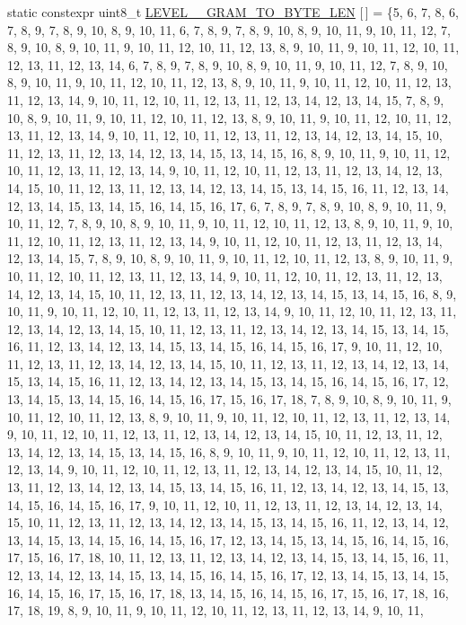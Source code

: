 \begin{DoxyCompactItemize}
static constexpr uint8\+\_\+t \hyperlink{classuva_1_1smt_1_1bpbd_1_1server_1_1lm_1_1m__grams_1_1m__gram__id_1_1_byte___m___gram___id_a9f88e7c86bd5e93cb7d5ebbf2cf680c7}{L\+E\+V\+E\+L\+\_\+\_\+\+G\+R\+A\+M\+\_\+\+T\+O\+\_\+\+B\+Y\+T\+E\+\_\+\+L\+E\+N} \mbox{[}$\,$\mbox{]} = \{5, 6, 7, 8, 6, 7, 8, 9, 7, 8, 9, 10, 8, 9, 10, 11, 6, 7, 8, 9, 7, 8, 9, 10, 8, 9, 10, 11, 9, 10, 11, 12, 7, 8, 9, 10, 8, 9, 10, 11, 9, 10, 11, 12, 10, 11, 12, 13, 8, 9, 10, 11, 9, 10, 11, 12, 10, 11, 12, 13, 11, 12, 13, 14, 6, 7, 8, 9, 7, 8, 9, 10, 8, 9, 10, 11, 9, 10, 11, 12, 7, 8, 9, 10, 8, 9, 10, 11, 9, 10, 11, 12, 10, 11, 12, 13, 8, 9, 10, 11, 9, 10, 11, 12, 10, 11, 12, 13, 11, 12, 13, 14, 9, 10, 11, 12, 10, 11, 12, 13, 11, 12, 13, 14, 12, 13, 14, 15, 7, 8, 9, 10, 8, 9, 10, 11, 9, 10, 11, 12, 10, 11, 12, 13, 8, 9, 10, 11, 9, 10, 11, 12, 10, 11, 12, 13, 11, 12, 13, 14, 9, 10, 11, 12, 10, 11, 12, 13, 11, 12, 13, 14, 12, 13, 14, 15, 10, 11, 12, 13, 11, 12, 13, 14, 12, 13, 14, 15, 13, 14, 15, 16, 8, 9, 10, 11, 9, 10, 11, 12, 10, 11, 12, 13, 11, 12, 13, 14, 9, 10, 11, 12, 10, 11, 12, 13, 11, 12, 13, 14, 12, 13, 14, 15, 10, 11, 12, 13, 11, 12, 13, 14, 12, 13, 14, 15, 13, 14, 15, 16, 11, 12, 13, 14, 12, 13, 14, 15, 13, 14, 15, 16, 14, 15, 16, 17, 6, 7, 8, 9, 7, 8, 9, 10, 8, 9, 10, 11, 9, 10, 11, 12, 7, 8, 9, 10, 8, 9, 10, 11, 9, 10, 11, 12, 10, 11, 12, 13, 8, 9, 10, 11, 9, 10, 11, 12, 10, 11, 12, 13, 11, 12, 13, 14, 9, 10, 11, 12, 10, 11, 12, 13, 11, 12, 13, 14, 12, 13, 14, 15, 7, 8, 9, 10, 8, 9, 10, 11, 9, 10, 11, 12, 10, 11, 12, 13, 8, 9, 10, 11, 9, 10, 11, 12, 10, 11, 12, 13, 11, 12, 13, 14, 9, 10, 11, 12, 10, 11, 12, 13, 11, 12, 13, 14, 12, 13, 14, 15, 10, 11, 12, 13, 11, 12, 13, 14, 12, 13, 14, 15, 13, 14, 15, 16, 8, 9, 10, 11, 9, 10, 11, 12, 10, 11, 12, 13, 11, 12, 13, 14, 9, 10, 11, 12, 10, 11, 12, 13, 11, 12, 13, 14, 12, 13, 14, 15, 10, 11, 12, 13, 11, 12, 13, 14, 12, 13, 14, 15, 13, 14, 15, 16, 11, 12, 13, 14, 12, 13, 14, 15, 13, 14, 15, 16, 14, 15, 16, 17, 9, 10, 11, 12, 10, 11, 12, 13, 11, 12, 13, 14, 12, 13, 14, 15, 10, 11, 12, 13, 11, 12, 13, 14, 12, 13, 14, 15, 13, 14, 15, 16, 11, 12, 13, 14, 12, 13, 14, 15, 13, 14, 15, 16, 14, 15, 16, 17, 12, 13, 14, 15, 13, 14, 15, 16, 14, 15, 16, 17, 15, 16, 17, 18, 7, 8, 9, 10, 8, 9, 10, 11, 9, 10, 11, 12, 10, 11, 12, 13, 8, 9, 10, 11, 9, 10, 11, 12, 10, 11, 12, 13, 11, 12, 13, 14, 9, 10, 11, 12, 10, 11, 12, 13, 11, 12, 13, 14, 12, 13, 14, 15, 10, 11, 12, 13, 11, 12, 13, 14, 12, 13, 14, 15, 13, 14, 15, 16, 8, 9, 10, 11, 9, 10, 11, 12, 10, 11, 12, 13, 11, 12, 13, 14, 9, 10, 11, 12, 10, 11, 12, 13, 11, 12, 13, 14, 12, 13, 14, 15, 10, 11, 12, 13, 11, 12, 13, 14, 12, 13, 14, 15, 13, 14, 15, 16, 11, 12, 13, 14, 12, 13, 14, 15, 13, 14, 15, 16, 14, 15, 16, 17, 9, 10, 11, 12, 10, 11, 12, 13, 11, 12, 13, 14, 12, 13, 14, 15, 10, 11, 12, 13, 11, 12, 13, 14, 12, 13, 14, 15, 13, 14, 15, 16, 11, 12, 13, 14, 12, 13, 14, 15, 13, 14, 15, 16, 14, 15, 16, 17, 12, 13, 14, 15, 13, 14, 15, 16, 14, 15, 16, 17, 15, 16, 17, 18, 10, 11, 12, 13, 11, 12, 13, 14, 12, 13, 14, 15, 13, 14, 15, 16, 11, 12, 13, 14, 12, 13, 14, 15, 13, 14, 15, 16, 14, 15, 16, 17, 12, 13, 14, 15, 13, 14, 15, 16, 14, 15, 16, 17, 15, 16, 17, 18, 13, 14, 15, 16, 14, 15, 16, 17, 15, 16, 17, 18, 16, 17, 18, 19, 8, 9, 10, 11, 9, 10, 11, 12, 10, 11, 12, 13, 11, 12, 13, 14, 9, 10, 11, 
\end{DoxyCompactItemize}
